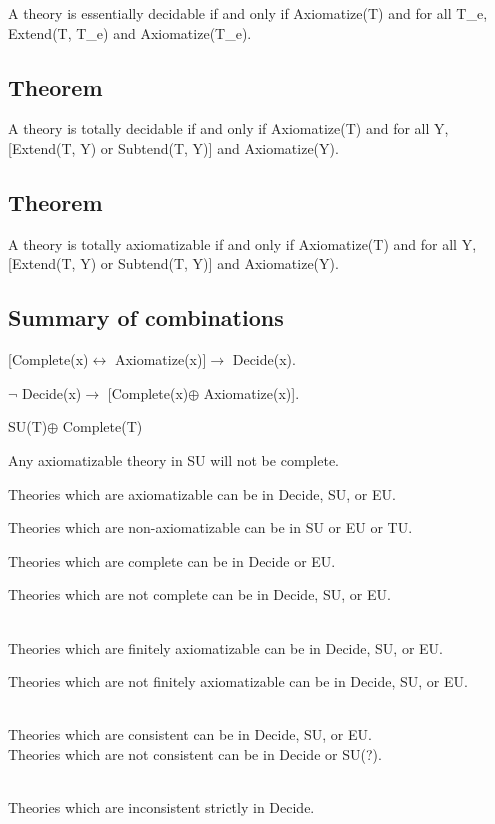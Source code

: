 A theory is essentially decidable if and only if Axiomatize(T) and for
all T\_e, Extend(T, T\_e) and Axiomatize(T\_e).

\hypertarget{theorem-6}{%
\subsection{Theorem}\label{theorem-6}}

A theory is totally decidable if and only if Axiomatize(T) and for all
Y, {[}Extend(T, Y) or Subtend(T, Y){]} and Axiomatize(Y).

\hypertarget{theorem-7}{%
\subsection{Theorem}\label{theorem-7}}

A theory is totally axiomatizable if and only if Axiomatize(T) and for
all Y, {[}Extend(T, Y) or Subtend(T, Y){]} and Axiomatize(Y).

\hypertarget{summary-of-combinations}{%
\subsection{Summary of combinations}\label{summary-of-combinations}}

{[}Complete(x)$\leftrightarrow$ Axiomatize(x){]}$\to$ Decide(x).

$\neg$ Decide(x)$\to$ {[}Complete(x)$\oplus$ Axiomatize(x){]}.

SU(T)$\oplus$ Complete(T)

Any axiomatizable theory in SU will not be complete.

Theories which are axiomatizable can be in Decide, SU, or EU.

Theories which are non-axiomatizable can be in SU or EU or TU.

Theories which are complete can be in Decide or EU.

Theories which are not complete can be in Decide, SU, or EU.\\
\strut \\
Theories which are finitely axiomatizable can be in Decide, SU, or EU.

Theories which are not finitely axiomatizable can be in Decide, SU, or
EU.\\
\strut \\
Theories which are consistent can be in Decide, SU, or EU.\\
Theories which are not consistent can be in Decide or SU(?).\\
\strut \\
Theories which are inconsistent strictly in Decide.

